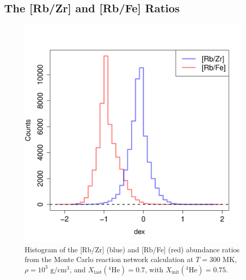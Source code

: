 
\subsection{The [Rb/Zr] and [Rb/Fe] Ratios}

\begin{figure}[t]
\centering
\includegraphics[width=5in]{Chapter-3/figs/Hist_Ele_Dex_Ratio_RbZr.png}
\caption{\label{fig:RbZr_Hist}Histogram of the [Rb/Zr] (blue) and [Rb/Fe] (red) abundance ratios from the Monte Carlo reaction network calculation at $T = 300$ MK, $\rho = 10^{3}$ $\mathrm{g}/\mathrm{cm}^{3}$, and $X_{\mathrm{last}}(^{4}\mathrm{He}) = 0.7$, with $X_{\mathrm{init}}(^{4}\mathrm{He}) = 0.75.$}
\end{figure}

